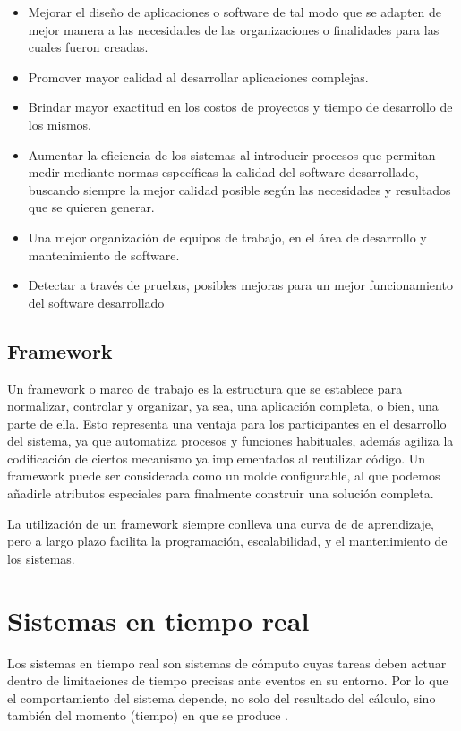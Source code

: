 \begin{itemize}
\item Mejorar el diseño de aplicaciones o software de tal modo que se adapten de mejor manera a las necesidades de las organizaciones o finalidades para las cuales fueron creadas.
\item Promover mayor calidad al desarrollar aplicaciones complejas.
\item Brindar mayor exactitud en los costos de proyectos y tiempo de desarrollo de los mismos.
\item Aumentar la eficiencia de los sistemas al introducir procesos que permitan medir mediante normas específicas la calidad del software desarrollado, buscando siempre la mejor calidad posible según las necesidades y resultados que se quieren generar.
\item Una mejor organización de equipos de trabajo, en el área de desarrollo y mantenimiento de software.
\item Detectar a través de pruebas, posibles mejoras para un mejor funcionamiento del software desarrollado     
\end{itemize}     
     
     \subsection{Framework}
Un framework o marco de trabajo es la estructura que se establece para normalizar, controlar y organizar, ya sea, una aplicación completa, o bien, una parte de ella. Esto representa una ventaja para los participantes en el desarrollo del sistema, ya que automatiza procesos y funciones habituales, además agiliza la codificación de ciertos mecanismo ya implementados al reutilizar código.
Un framework puede ser considerada como un molde configurable, al que podemos añadirle atributos especiales para finalmente construir una solución completa.

\vspace{0.3cm}
La utilización de un framework siempre conlleva una curva de de aprendizaje, pero a largo plazo facilita la programación, escalabilidad, y el mantenimiento de los sistemas.

    \section{Sistemas en tiempo real}\label{sec:sistr}

    Los sistemas en tiempo real son sistemas de cómputo cuyas tareas deben actuar dentro de limitaciones de tiempo precisas ante eventos en su entorno. Por lo que el comportamiento del sistema depende, no solo del resultado del cálculo, sino también del momento (tiempo) en que se produce \cite{Buta2011}.
    

